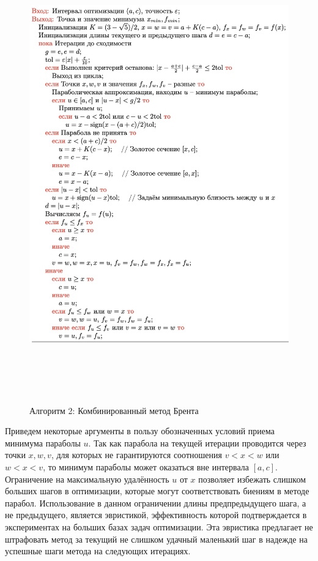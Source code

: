 \begin{figure}[hbt!]
    \centering
    \includegraphics[width=14cm, height=19cm]{images/im224.png}
    \label{ris:im224}
    \caption{Алгоритм 2: Комбинированный метод Брента}
\end{figure}
\newline  \newline
Приведем некоторые аргументы в пользу обозначенных условий приема минимума параболы $u$. Так как парабола на текущей итерации проводится через точки $x,w,v$, для которых не гарантируются соотношения $v < x < w$ или $w < x < v$, то минимум параболы может оказаться вне интервала $[a,c]$. Ограничение на максимальную удалённость $u$ от $x$ позволяет избежать слишком больших шагов в оптимизации, которые могут соответствовать биениям в методе парабол. Использование в данном ограничении длины предпредыдущего шага, а не предыдущего, является эвристикой, эффективность которой подтверждается в экспериментах на больших базах задач оптимизации. Эта эвристика предлагает не штрафовать метод за текущий не слишком удачный маленький шаг в надежде на успешные шаги метода на следующих итерациях.


